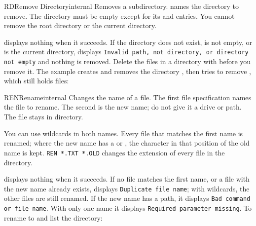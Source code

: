 \begin{DosEntry}{RD}{Remove Directory}{internal}
\Purpose Removes a subdirectory.
\Format {}
\Remarks
{} names the directory to remove.  The directory must be empty
except for its  and  entries.  You cannot remove the root
directory or the current directory.

 displays nothing when it succeeds.  If the directory does not
exist, is not empty, or is the current directory,  displays
\texttt{Invalid path, not directory, or directory not empty} and nothing is
removed.  Delete the files in a directory with  before you remove
it.
\Example
The example creates and removes the directory , then tries to
remove , which still holds files:
\end{DosEntry}

\begin{DosEntry}{REN}{Rename}{internal}
\Purpose Changes the name of a file.
\Format {}
\Remarks
The first file specification names the file to rename.  The second is the
new name; do not give it a drive or path.  The file stays in  directory.

You can use wildcards in both names.  Every file that matches the first name
is renamed; where the new name has a  or \type{*}, the character in
that position of the old name is kept.  \texttt{REN *.TXT *.OLD} changes the
extension of every  file in the directory.

 displays nothing when it succeeds.  If no file matches the first
name, or a file with the new name already exists,  displays
\texttt{Duplicate file name}; with wildcards, the other files are still
renamed.  If the new name has a path, it displays
\texttt{Bad command or file name}.  With only one name it displays
\texttt{Required parameter missing}.
\Example
To rename  to  and list the directory:
\end{DosEntry}

